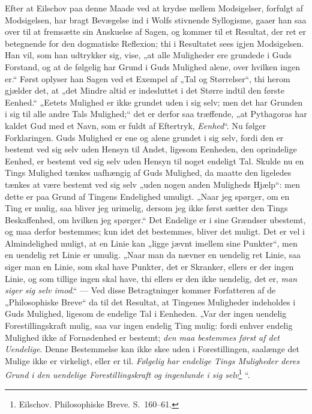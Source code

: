 \documentclass[12pt]{book}
\newcommand{\opage}[1]{\marginnote{\footnotesize\textit{[#1]}}}
\begin{document}
Efter at Eilschov paa denne Maade ved at krydse mellem Modsigelser, forfulgt af Modsigelsen, har bragt Bevægelse ind i Wolfs stivnende Syllogisme, gaaer han saa over til at fremsætte sin Anskuelse af Sagen, og kommer til et Resultat, der ret er betegnende for den dogmatiske Reflexion; thi i Resultatet sees igjen Modsigelsen. Han vil, som han udtrykker sig, vise, „at alle Muligheder ere grundede i Guds Forstand, og at de følgelig har Grund i Guds Mulighed alene, over hvilken ingen er.“ Først oplyser han Sagen ved et Exempel af „Tal og Størrelser“, thi herom gjælder det, at „det Mindre altid er indesluttet i det Større indtil den første Eenhed.“ „Eetets Mulighed er ikke grundet uden i sig selv; men det har Grunden i sig til alle andre Tals Mulighed;“ det er derfor saa træffende, „at Pythagoras har kaldet Gud
\opage{233}med et Navn, som er fuldt af Eftertryk, \emph{Eenhed}“. Nu følger Forklaringen. Guds Mulighed er ene og alene grundet i sig selv, fordi den er bestemt ved sig selv uden Hensyn til Andet, ligesom Eenheden, den oprindelige Eenhed, er bestemt ved sig selv uden Hensyn til noget endeligt Tal. Skulde nu en Tings Mulighed tænkes uafhængig af Guds Mulighed, da maatte den ligeledes tænkes at være bestemt ved sig selv „uden nogen anden Muligheds Hjælp“: men dette er paa Grund af Tingens Endelighed umuligt. „Naar jeg spørger, om en Ting er mulig, saa bliver jeg urimelig, dersom jeg ikke først sætter den Tings Beskaffenhed, om hvilken jeg spørger.“ Det Endelige er i sine Grændser ubestemt, og maa derfor bestemmes; kun idet det bestemmes, bliver det muligt. Det er vel i Almindelighed muligt, at en Linie kan „ligge jævnt imellem sine Punkter“, men en uendelig ret Linie er umulig. „Naar man da nævner en uendelig ret Linie, saa siger man en Linie, som skal have Punkter, det er Skranker, ellers er der ingen Linie, og som tillige ingen skal have, thi ellers er den ikke uendelig, det er, \emph{man siger sig selv imod}.“ --- Ved disse Betragtninger kommer Forfatteren af de „Philosophiske Breve“ da til det Resultat, at Tingenes Muligheder indeholdes i Guds Mulighed, ligesom de endelige Tal i Eenheden. „Var der ingen uendelig Forestillingskraft mulig, saa var ingen endelig Ting mulig: fordi enhver endelig Mulighed ikke af Fornødenhed er bestemt; \emph{den maa bestemmes først af det Uendelige}. Denne Bestemmelse kan ikke skee uden i Forestillingen, saalænge det Mulige ikke er virkeligt, eller er til. \emph{Følgelig har endelige Tings Muligheder deres Grund i den uendelige Forestillingskraft og ingenlunde i sig selv}\footnote{Eilschov. Philosophiske Breve. S.~160--61.}%
“.
\end{document}

